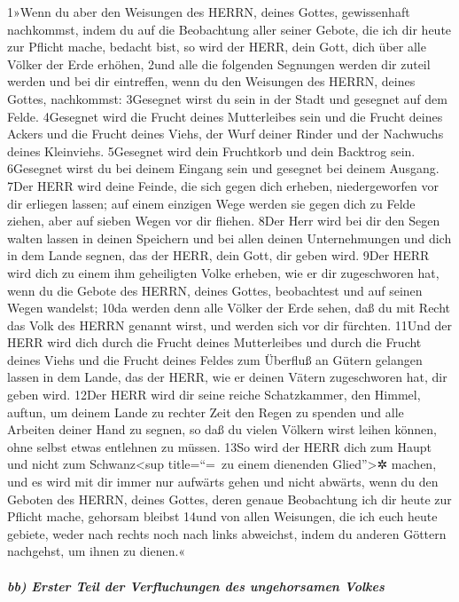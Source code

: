 1»Wenn du aber den Weisungen des HERRN, deines Gottes, gewissenhaft
nachkommst, indem du auf die Beobachtung aller seiner Gebote, die ich
dir heute zur Pflicht mache, bedacht bist, so wird der HERR, dein Gott,
dich über alle Völker der Erde erhöhen, 2und alle die folgenden
Segnungen werden dir zuteil werden und bei dir eintreffen, wenn du den
Weisungen des HERRN, deines Gottes, nachkommst: 3Gesegnet wirst du sein
in der Stadt und gesegnet auf dem Felde. 4Gesegnet wird die Frucht
deines Mutterleibes sein und die Frucht deines Ackers und die Frucht
deines Viehs, der Wurf deiner Rinder und der Nachwuchs deines
Kleinviehs. 5Gesegnet wird dein Fruchtkorb und dein Backtrog sein.
6Gesegnet wirst du bei deinem Eingang sein und gesegnet bei deinem
Ausgang. 7Der HERR wird deine Feinde, die sich gegen dich erheben,
niedergeworfen vor dir erliegen lassen; auf einem einzigen Wege werden
sie gegen dich zu Felde ziehen, aber auf sieben Wegen vor dir fliehen.
8Der Herr wird bei dir den Segen walten lassen in deinen Speichern und
bei allen deinen Unternehmungen und dich in dem Lande segnen, das der
HERR, dein Gott, dir geben wird. 9Der HERR wird dich zu einem ihm
geheiligten Volke erheben, wie er dir zugeschworen hat, wenn du die
Gebote des HERRN, deines Gottes, beobachtest und auf seinen Wegen
wandelst; 10da werden denn alle Völker der Erde sehen, daß du mit Recht
das Volk des HERRN genannt wirst, und werden sich vor dir fürchten.
11Und der HERR wird dich durch die Frucht deines Mutterleibes und durch
die Frucht deines Viehs und die Frucht deines Feldes zum Überfluß an
Gütern gelangen lassen in dem Lande, das der HERR, wie er deinen Vätern
zugeschworen hat, dir geben wird. 12Der HERR wird dir seine reiche
Schatzkammer, den Himmel, auftun, um deinem Lande zu rechter Zeit den
Regen zu spenden und alle Arbeiten deiner Hand zu segnen, so daß du
vielen Völkern wirst leihen können, ohne selbst etwas entlehnen zu
müssen. 13So wird der HERR dich zum Haupt und nicht zum
Schwanz\textless sup title=``=~zu einem dienenden Glied''\textgreater✲
machen, und es wird mit dir immer nur aufwärts gehen und nicht abwärts,
wenn du den Geboten des HERRN, deines Gottes, deren genaue Beobachtung
ich dir heute zur Pflicht mache, gehorsam bleibst 14und von allen
Weisungen, die ich euch heute gebiete, weder nach rechts noch nach links
abweichst, indem du anderen Göttern nachgehst, um ihnen zu dienen.«

\hypertarget{bb-erster-teil-der-verfluchungen-des-ungehorsamen-volkes}{%
\subparagraph{bb) Erster Teil der Verfluchungen des ungehorsamen
Volkes}\label{bb-erster-teil-der-verfluchungen-des-ungehorsamen-volkes}}

